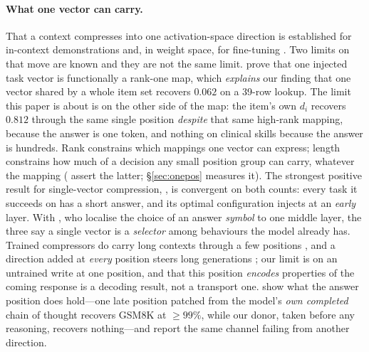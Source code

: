 \documentclass{article}
\newcommand{\dvec}{\ensuremath{d}}
\begin{document}
\paragraph{What one vector can carry.} That a context compresses into one
activation-space direction is established for in-context demonstrations
\citep{hendel2023taskvectors, todd2024functionvectors} and, in weight space, for
fine-tuning \citep{ilharco2023taskarithmetic}. Two limits on that move are
known and they are not the same limit. \citet{dong2026taskvectorlimits} prove
that one injected task vector is functionally a rank-one map, which
\emph{explains} our finding that one vector shared by a whole item set recovers
$0.062$ on a 39-row lookup. The limit this paper is about is on the other side
of the map: the item's own $\dvec_i$ recovers $0.812$ through the same single
position \emph{despite} that same high-rank mapping, because the answer is one
token, and nothing on clinical skills because the answer is hundreds. Rank
constrains which mappings one vector can express; length constrains how much of
a decision any small position group can carry, whatever the mapping
(\citealp{dura2026sequentialpatching} assert the latter; \S\ref{sec:onepos}
measures it). The strongest positive result for single-vector compression,
\citet{ardoin2026promptcompression}, is convergent on both counts: every task it
succeeds on has a short answer, and its optimal configuration injects at an
\emph{early} layer. With \citet{wiegreffe2025mcq}, who localise the choice of an
answer \emph{symbol} to one middle layer, the three say a single vector is a
\emph{selector} among behaviours the model already has.
Trained compressors do carry long contexts through a few positions
\citep{mu2023gist, ge2024icae}, and a direction added at \emph{every} position
steers long generations \citep{panickssery2024caa, liu2024icv,
stolfo2025instruction}; our limit is on an untrained write at one position, and
that this position \emph{encodes} properties of the coming response
\citep{dong2025planning} is a decoding result, not a transport one.
\citet{mehrafarin2026cothidden} show what the answer position does hold---one
late position patched from the model's \emph{own completed} chain of thought
recovers GSM8K at $\ge99\%$, while our donor, taken before any reasoning,
recovers nothing---and \citet{dasilva2025steeringoff} report the same channel
failing from another direction.
\end{document}
